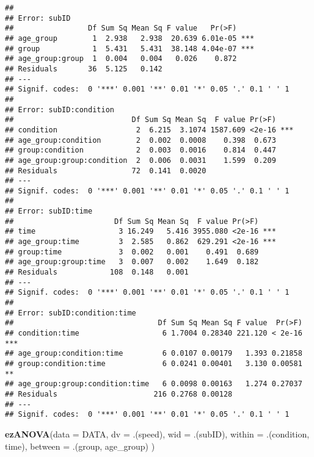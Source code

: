 \documentclass[]{article}
\newenvironment{Shaded}{\begin{snugshade}}{\end{snugshade}}
\newcommand{\DataTypeTok}[1]{\textcolor[rgb]{0.13,0.29,0.53}{#1}}
\newcommand{\KeywordTok}[1]{\textcolor[rgb]{0.13,0.29,0.53}{\textbf{#1}}}
\newcommand{\NormalTok}[1]{#1}
\begin{document}
\begin{verbatim}
## 
## Error: subID
##                 Df Sum Sq Mean Sq F value   Pr(>F)    
## age_group        1  2.938   2.938  20.639 6.01e-05 ***
## group            1  5.431   5.431  38.148 4.04e-07 ***
## age_group:group  1  0.004   0.004   0.026    0.872    
## Residuals       36  5.125   0.142                     
## ---
## Signif. codes:  0 '***' 0.001 '**' 0.01 '*' 0.05 '.' 0.1 ' ' 1
## 
## Error: subID:condition
##                           Df Sum Sq Mean Sq  F value Pr(>F)    
## condition                  2  6.215  3.1074 1587.609 <2e-16 ***
## age_group:condition        2  0.002  0.0008    0.398  0.673    
## group:condition            2  0.003  0.0016    0.814  0.447    
## age_group:group:condition  2  0.006  0.0031    1.599  0.209    
## Residuals                 72  0.141  0.0020                    
## ---
## Signif. codes:  0 '***' 0.001 '**' 0.01 '*' 0.05 '.' 0.1 ' ' 1
## 
## Error: subID:time
##                       Df Sum Sq Mean Sq  F value Pr(>F)    
## time                   3 16.249   5.416 3955.080 <2e-16 ***
## age_group:time         3  2.585   0.862  629.291 <2e-16 ***
## group:time             3  0.002   0.001    0.491  0.689    
## age_group:group:time   3  0.007   0.002    1.649  0.182    
## Residuals            108  0.148   0.001                    
## ---
## Signif. codes:  0 '***' 0.001 '**' 0.01 '*' 0.05 '.' 0.1 ' ' 1
## 
## Error: subID:condition:time
##                                 Df Sum Sq Mean Sq F value  Pr(>F)    
## condition:time                   6 1.7004 0.28340 221.120 < 2e-16 ***
## age_group:condition:time         6 0.0107 0.00179   1.393 0.21858    
## group:condition:time             6 0.0241 0.00401   3.130 0.00581 ** 
## age_group:group:condition:time   6 0.0098 0.00163   1.274 0.27037    
## Residuals                      216 0.2768 0.00128                    
## ---
## Signif. codes:  0 '***' 0.001 '**' 0.01 '*' 0.05 '.' 0.1 ' ' 1
\end{verbatim}

\begin{Shaded}
\begin{Highlighting}[]
\KeywordTok{ezANOVA}\NormalTok{(}\DataTypeTok{data =}\NormalTok{ DATA, }
    \DataTypeTok{dv =}\NormalTok{ .(speed),}
    \DataTypeTok{wid =}\NormalTok{ .(subID),}
    \DataTypeTok{within =}\NormalTok{ .(condition, time),}
    \DataTypeTok{between =}\NormalTok{ .(group, age\_group)}
\NormalTok{)}
\end{Highlighting}
\end{Shaded}
\end{document}
